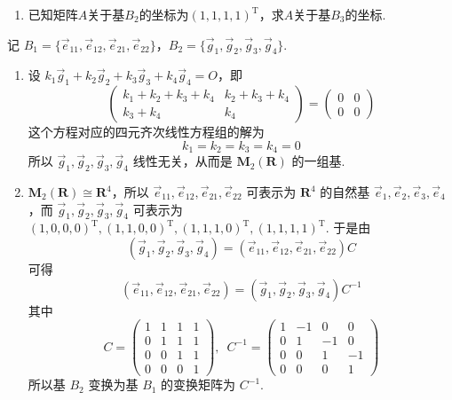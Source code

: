 \begin{exercise}
\begin{exgroup}
\begin{enumerate}
            \item 已知矩阵$A$关于基$B_2$的坐标为$(1,1,1,1)^\mathrm{T}$，求$A$关于基$B_3$的坐标.
        \end{enumerate}
        \begin{answer}
            记 $ B_1 = \{\vec{e}_{11}, \vec{e}_{12}, \vec{e}_{21}, \vec{e}_{22}\} $，$ B_2 = \{\vec{g}_1, \vec{g}_2, \vec{g}_3, \vec{g}_4\} $.
            \begin{enumerate}
                \item 设 $ k_1 \vec{g}_1 + k_2 \vec{g}_2 + k_3 \vec{g}_3 + k_4 \vec{g}_4 = O $，即
                      \[ \begin{pmatrix} k_1 + k_2 + k_3 + k_4 & k_2 + k_3 + k_4 \\ k_3 + k_4 & k_4 \end{pmatrix} = \begin{pmatrix} 0 & 0 \\ 0 & 0 \end{pmatrix} \]
                      这个方程对应的四元齐次线性方程组的解为
                      \[ k_1 = k_2 = k_3 = k_4 = 0 \]
                      所以 $ \vec{g}_1, \vec{g}_2, \vec{g}_3, \vec{g}_4 $ 线性无关，从而是 $ \mathbf{M}_2(\mathbf{R}) $ 的一组基.

                \item \label{item:11:B:4:2}
                      $ \mathbf{M}_2(\mathbf{R}) \cong \mathbf{R}^4 $，所以 $ \vec{e}_{11}, \vec{e}_{12}, \vec{e}_{21}, \vec{e}_{22} $ 可表示为 $ \mathbf{R}^4 $ 的自然基 $ \vec{e}_1, \vec{e}_2, \vec{e}_3, \vec{e}_4 $，而 $ \vec{g}_1, \vec{g}_2, \vec{g}_3, \vec{g}_4 $ 可表示为 $ (1, 0, 0, 0)^{\mathrm{T}},\allowbreak (1, 1, 0, 0)^{\mathrm{T}},\allowbreak (1, 1, 1, 0)^{\mathrm{T}},\allowbreak (1, 1, 1, 1)^{\mathrm{T}} $. 于是由
                      \[ (\vec{g}_1, \vec{g}_2, \vec{g}_3, \vec{g}_4) = (\vec{e}_{11}, \vec{e}_{12}, \vec{e}_{21}, \vec{e}_{22}) C \]
                      可得
                      \[ (\vec{e}_{11}, \vec{e}_{12}, \vec{e}_{21}, \vec{e}_{22}) = (\vec{g}_1, \vec{g}_2, \vec{g}_3, \vec{g}_4) C^{-1} \]
                      其中
                      \[ C = \begin{pmatrix}
                              1 & 1 & 1 & 1 \\
                              0 & 1 & 1 & 1 \\
                              0 & 0 & 1 & 1 \\
                              0 & 0 & 0 & 1
                          \end{pmatrix},\enspace C^{-1} = \begin{pmatrix}
                              1 & -1 & 0  & 0  \\
                              0 & 1  & -1 & 0  \\
                              0 & 0  & 1  & -1 \\
                              0 & 0  & 0  & 1
                          \end{pmatrix} \]
                      所以基 $ B_2 $ 变换为基 $ B_1 $ 的变换矩阵为 $ C^{-1} $.


\end{enumerate}
\end{answer}
\end{exgroup}
\end{exercise}
